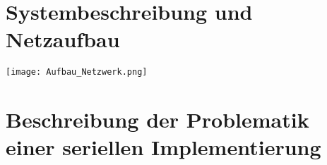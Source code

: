 \documentclass[../main.tex]{subfiles}
\begin{document}
\section{Systembeschreibung und Netzaufbau}
\texttt{[image: Aufbau\_Netzwerk.png]} %
\section{Beschreibung der Problematik einer seriellen Implementierung}
\end{document}
